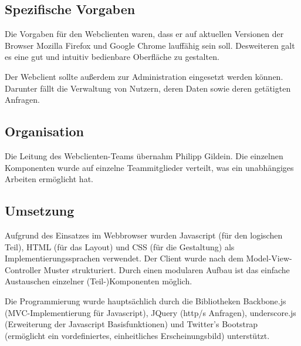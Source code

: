 \subsection*{Spezifische Vorgaben}

Die Vorgaben für den Webclienten waren, dass er auf aktuellen Versionen der Browser Mozilla Firefox und Google Chrome lauffähig sein soll.
Desweiteren galt es eine gut und intuitiv bedienbare Oberfläche zu gestalten.

Der Webclient sollte außerdem zur Administration eingesetzt werden können.
Darunter fällt die Verwaltung von Nutzern, deren Daten sowie deren getätigten Anfragen.

\subsection*{Organisation}

Die Leitung des Webclienten-Teams übernahm Philipp Gildein. Die einzelnen Komponenten wurde auf einzelne Teammitglieder verteilt, was ein unabhängiges Arbeiten ermöglicht hat. 

\subsection*{Umsetzung}

Aufgrund des Einsatzes im Webbrowser wurden Javascript (für den logischen Teil), HTML (für das Layout) und CSS (für die Gestaltung) als Implementierungssprachen verwendet.
Der Client wurde nach dem Model-View-Controller Muster strukturiert. 
Durch einen modularen Aufbau ist das einfache Austauschen einzelner (Teil-)Komponenten möglich.

Die Programmierung wurde hauptsächlich durch die Bibliotheken Backbone.js (MVC-Implementierung für Javascript), JQuery (http/s Anfragen), underscore.js (Erweiterung der Javascript Basisfunktionen) und Twitter's Bootstrap (ermöglicht ein vordefiniertes, einheitliches Erscheinungsbild) unterstützt.